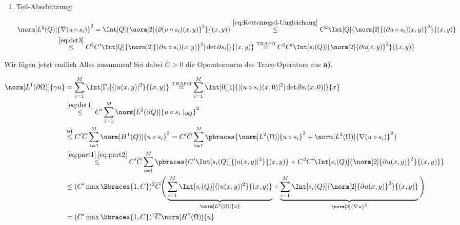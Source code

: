\begin{solution}
\begin{enumerate}[label = \textbf{\alph*)}]
\begin{enumerate}[label = \arabic*.]
\begin{enumerate}[label = \arabic*.]
      \item Teil-Abschätzung:

      \begin{multline}
        \label{eq:part2}
        \norm[L^2(Q)]{\nabla (u \circ s_i)}^2
        =
        \Int[Q]{\norm[2]{\partial (u \circ s_i)(x, y)}^2}{(x, y)}
        \stackrel
        {
          \eqref{eq:Kettenregel-Ungleichung}
        }{\leq}
        C^2 \Int[Q]{\norm[2]{(\partial u \circ s_i)(x, y)}^2}{(x, y)} \\
        \stackrel
        {
          \eqref{eq:det3}
        }{\leq}
        C^2 C^\prime \Int[Q]{\norm[2]{(\partial u \circ s_i)(x, y)}^2 |\det \partial s_i|}{(x, y)}
        \stackrel
        {
          \text{TRAFO}
        }{=}
        C^2 C^\prime \Int[s_i(Q)]{\norm[2]{\partial u(x, y)}^2}{(x, y)}
      \end{multline}

    \end{enumerate}

    Wir fügen jetzt endlich Alles zusammen!
    Sei dabei $\overline{C} > 0$ die Operatornorm des Trace-Operators aus \textbf{a)}.

    \begin{align*}
      \norm[L^1(\partial \Omega)]{\gamma u}
      & =
      \sum_{i=1}^M
      \Int[\Gamma_i]{|u(x, y)|^2}{(x, y)}
      \stackrel
      {
        \text{TRAFO}
      }{=}
      \sum_{i=1}^M
      \Int[0][1]{|(u \circ s_i)(x, 0)|^2 |\det \partial s_i(x, 0)|}{x} \\
      & \stackrel{\eqref{eq:det1}}{\leq}
      C^\prime
      \sum_{i=1}^M
      \norm[L^2(\partial Q)]{u \circ s_i \mid_{\partial Q}}^2 \\
      & \stackrel
      {
        \textbf{a)}
      }{\leq}
      C^\prime
      \overline{C}
      \sum_{i=1}^M
      \norm[H^1(Q)]{u \circ s_i}^2
      =
      C^\prime
      \overline{C}
      \sum_{i=1}^M
      \pbraces
      {
        \norm[L^2(\Omega)]{u \circ s_i}^2
        +
        \norm[L^2(\Omega)]{\nabla (u \circ s_i)}^2
      } \\
      & \stackrel
      {
        \eqref{eq:part1},
        \eqref{eq:part2}
      }{\leq}
      C^\prime
      \overline{C}
      \sum_{i=1}^M
      \pbraces
      {
        C^\prime
        \Int[s_i(Q)]{|u(x, y)|^2}{(x, y)}
        +
        C^2 C^\prime
        \Int[s_i(Q)]{\norm[2]{\partial u(x, y)}^2}{(x, y)}
      } \\
      & \leq
      (
        C^\prime
        \max \Bbraces{1, C}
      )^2
      \overline{C}
      \Bigg (
        \underbrace
        {
          \sum_{i=1}^M
          \Int[s_i(Q)]{|u(x, y)|^2}{(x, y)}
        }_{
          \norm[L^2(\Omega)]{u}
        }
        +
        \underbrace
        {
          \sum_{i=1}^M
          \Int[s_i(Q)]{\norm[2]{\partial u(x, y)}^2}{(x, y)}
        }_{
          \norm[2]{\nabla u}^2
        }
      \Bigg ) \\
      & =
      (
        C^\prime
        \max \Bbraces{1, C}
      )^2
      \overline{C}
      \norm[H^1(\Omega)]{u}
    \end{align*}


\end{enumerate}
\end{enumerate}
\end{solution}
